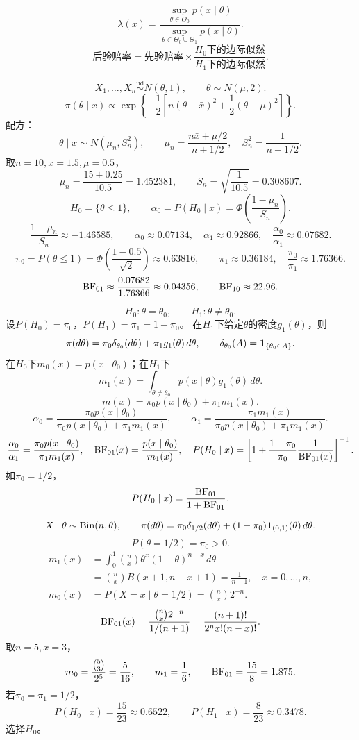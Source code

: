 \[
\lambda(x)=\frac{\sup_{\theta\in\Theta_0}p(x\mid\theta)}
{\sup_{\theta\in\Theta_0\cup\Theta_1}p(x\mid\theta)}.
\]
\[
\text{后验赔率}=\text{先验赔率}\times
\frac{H_0\text{下的边际似然}}{H_1\text{下的边际似然}}.
\]

\[
X_1,\ldots,X_n\overset{\mathrm{iid}}{\sim}N(\theta,1),\qquad
\theta\sim N(\mu,2).
\]
\[
\pi(\theta\mid x)\propto
\exp\left\{-\frac12\left[n(\theta-\bar x)^2+\frac12(\theta-\mu)^2\right]\right\}.
\]
配方：
\[
\theta\mid x\sim N(\mu_n,S_n^2),\qquad
\mu_n=\frac{n\bar x+\mu/2}{n+1/2},\quad S_n^2=\frac1{n+1/2}.
\]
取$n=10,\bar x=1.5,\mu=0.5$，
\[
\mu_n=\frac{15+0.25}{10.5}=1.452381,\qquad
S_n=\sqrt{\frac1{10.5}}=0.308607.
\]
\[
H_0=\{\theta\leq1\},\qquad
\alpha_0=P(H_0\mid x)=\Phi\left(\frac{1-\mu_n}{S_n}\right).
\]
\[
\frac{1-\mu_n}{S_n}\approx-1.46585,\qquad
\alpha_0\approx0.07134,\quad\alpha_1\approx0.92866,\quad
\frac{\alpha_0}{\alpha_1}\approx0.07682.
\]
\[
\pi_0=P(\theta\leq1)
=\Phi\left(\frac{1-0.5}{\sqrt2}\right)\approx0.63816,\qquad
\pi_1\approx0.36184,\quad\frac{\pi_0}{\pi_1}\approx1.76366.
\]
\[
\operatorname{BF}_{01}\approx\frac{0.07682}{1.76366}\approx0.04356,\qquad
\operatorname{BF}_{10}\approx22.96.
\]

\[
H_0:\theta=\theta_0,\qquad H_1:\theta\ne\theta_0.
\]
设$P(H_0)=\pi_0$，$P(H_1)=\pi_1=1-\pi_0$。
在$H_1$下给定$\theta$的密度$g_1(\theta)$，则
\[
\pi(d\theta)=\pi_0\delta_{\theta_0}(d\theta)+\pi_1g_1(\theta)\,d\theta,
\qquad
\delta_{\theta_0}(A)=\mathbf{1}_{\{\theta_0\in A\}}.
\]
在$H_0$下$m_0(x)=p(x\mid\theta_0)$；在$H_1$下
\[
m_1(x)=\int_{\theta\ne\theta_0}p(x\mid\theta)g_1(\theta)\,d\theta.
\]
\[
m(x)=\pi_0p(x\mid\theta_0)+\pi_1m_1(x).
\]
\[
\alpha_0=\frac{\pi_0p(x\mid\theta_0)}
{\pi_0p(x\mid\theta_0)+\pi_1m_1(x)},\qquad
\alpha_1=\frac{\pi_1m_1(x)}
{\pi_0p(x\mid\theta_0)+\pi_1m_1(x)}.
\]
\[
\frac{\alpha_0}{\alpha_1}=\frac{\pi_0p(x\mid\theta_0)}{\pi_1m_1(x)},\quad
\operatorname{BF}_{01}(x)=\frac{p(x\mid\theta_0)}{m_1(x)},\quad
P(H_0\mid x)=
\left[1+\frac{1-\pi_0}{\pi_0}\frac1{\operatorname{BF}_{01}(x)}\right]^{-1}.
\]
如$\pi_0=1/2$，
\[
P(H_0\mid x)=\frac{\operatorname{BF}_{01}}{1+\operatorname{BF}_{01}}.
\]

\[
X\mid\theta\sim\operatorname{Bin}(n,\theta),\qquad
\pi(d\theta)=\pi_0\delta_{1/2}(d\theta)
+(1-\pi_0)\mathbf{1}_{(0,1)}(\theta)\,d\theta.
\]
\[
P(\theta=1/2)=\pi_0>0.
\]
\begin{align*}
m_1(x)&=\int_0^1\binom nx\theta^x(1-\theta)^{n-x}\,d\theta\\
&=\binom nx B(x+1,n-x+1)=\frac1{n+1},\quad x=0,\ldots,n,\\
m_0(x)&=P(X=x\mid\theta=1/2)=\binom nx2^{-n}.
\end{align*}
\[
\operatorname{BF}_{01}(x)=\frac{\binom nx2^{-n}}{1/(n+1)}
=\frac{(n+1)!}{2^n x!(n-x)!}.
\]
取$n=5,x=3$，
\[
m_0=\frac{\binom53}{2^5}=\frac5{16},\qquad
m_1=\frac16,\qquad\operatorname{BF}_{01}=\frac{15}{8}=1.875.
\]
若$\pi_0=\pi_1=1/2$，
\[
P(H_0\mid x)=\frac{15}{23}\approx0.6522,\qquad
P(H_1\mid x)=\frac8{23}\approx0.3478.
\]
选择$H_0$。
